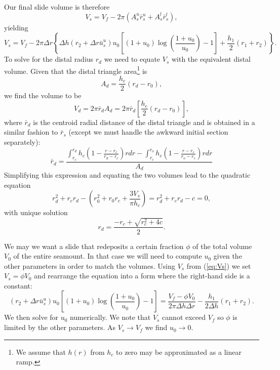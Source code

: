\documentclass[12pt,letterpaper,margin=0.5in]{report}
\begin{document}
Our final slide volume is therefore
\begin{equation}
V_s = V_f - 2 \pi \left (A^u_s \bar{r}^u_s + A^l_s \bar{r}^l_s \right ),
\end{equation}
yielding
\begin{equation}
V_s = V_f - 2 \pi \Delta r \left \{ \Delta h \left ( r_2 + \Delta r\bar{u}_s^u \right ) u_0 \left [ (1 + u_0) \log \left (\frac{1 + u_0}{u_0} \right ) - 1 \right ] + \frac{h_1}{2} (r_1 + r_2) \right \}.
\label{eq:Vs}
\end{equation}
To solve for the distal radius $r_d$ we need to equate $V_s$ with the equivalent distal volume.
Given that the distal triangle area\footnote{We assume that $h(r)$ from $h_c$ to zero may be approximated as a linear ramp.} is
\begin{equation}
A_d = \frac{h_c}{2} (r_d - r_0),
\end{equation}
we find the volume to be
\begin{equation}
V_d = 2 \pi \bar{r}_d A_d = 2 \pi \bar{r}_d \left [ \frac{h_c}{2} (r_d - r_0) \right ],
\end{equation}
where $\bar{r}_d$ is the centroid radial distance of the distal triangle and is obtained in a similar fashion to $\bar{r}_s$ (except
we must handle the awkward initial section separately):
\begin{equation}
\bar{r}_d = \frac{\int_{r_c}^{r_d}h_c \left (1 - \frac{r - r_c}{r_d - r_c} \right )rdr - \int_{r_c}^{r_o}h_c \left (1 - \frac{r - r_c}{r_o- r_c} \right )rdr}{A_d}
\end{equation}
Simplifying this expression and equating the two volumes lead to the quadratic equation
\begin{equation}
r_d^2 + r_c r_d - \left (r_0^2 + r_0 r_c + \frac{3 V_s}{\pi h_c}\right ) = r_d^2 + r_c r_d - c = 0,
\end{equation}
with unique solution
\begin{equation}
r_d = \frac{-r_c + \sqrt{r_c^2 + 4c}}{2}.
\end{equation}

We may we want a slide that redeposits a certain fraction $\phi$ of the total volume $V_0$ of the entire seamount. In that
case we will need to compute $u_0$ given the other parameters in order to match the volumes.  Using
$V_s$ from (\ref{eq:Vs}) we set $V_s = \phi V_0$ and rearrange the equation into a form where the right-hand side is a constant:
\begin{equation}
\left ( r_2 + \Delta r \bar{u}_s^u \right ) u_0 \left [ (1 + u_0) \log \left (\frac{1 + u_0}{u_0} \right ) - 1 \right ] = \frac{V_f - \phi V_0}{2 \pi \Delta h \Delta r} - \frac{h_1}{2\Delta h}(r_1 + r_2).
\end{equation}
We then solve for $u_0$ numerically.  We note that $V_s$ cannot exceed $V_f$ so $\phi$ is limited by the other parameters.  As
$V_s \rightarrow V_f$ we find $u_0 \rightarrow 0$.
\end{document}
